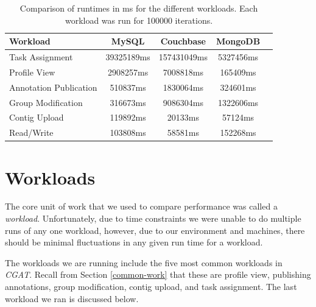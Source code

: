 \documentclass[12pt]{ucthesis}
\begin{document}
\begin{table}[t]
   \centering
      \begin{tabular}{| l | c | c | c | c |}
         \hline
            {\textbf{Workload}} &
            {\textbf{MySQL}} &
            {\textbf{Couchbase}} &
            {\textbf{MongoDB}}\\
         \hline
            Task Assignment         & 39325189ms & 157431049ms\footnotemark{} & 5327456ms\\
         \hline
            Profile View            & 2908257ms & 7008818ms & 165409ms\\
         \hline
            Annotation Publication  & 510837ms & 1830064ms & 324601ms\\
         \hline
            Group Modification      & 316673ms & 9086304ms & 1322606ms\\
         \hline
            Contig Upload           & 119892ms & 20133ms & 57124ms \\
         \hline
            Read/Write              & 103808ms & 58581ms & 152268ms \\
         \hline
      \end{tabular}
      \caption{Comparison of runtimes in ms for the different workloads.
               Each workload was run for 100000 iterations.}
      \label{tab:workload_perf}
\end{table}

\section{Workloads}\label{sec:workload}
The core unit of work that we used to compare performance was called a \textit{workload}.
Unfortunately, due to time constraints we were
unable to do multiple runs of any one workload, however, due to our environment
and machines, there should be minimal fluctuations in any given run time for a
workload.

The workloads we are running include the five most common workloads in \textit{CGAT}. 
Recall from Section \ref{common-work} that these are profile view,
publishing annotations, group modification, contig upload, and task assignment.
The last workload we ran is discussed below.
\end{document}
